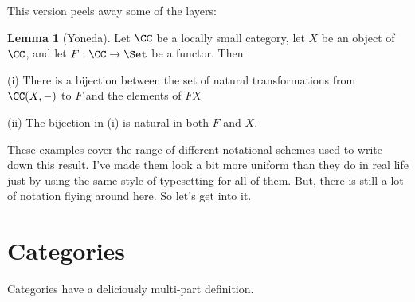 \documentclass[12pt]{article}
\theoremstyle{definition}
\newtheorem{lemma}[thm]{Lemma}
\theoremstyle{definition}
\theoremstyle{definition}
\numberwithin{equation}{section}
\begin{document}
\noindent
This version peels away some of the layers:

\begin{lemma}[Yoneda]\label{yoneda6}
Let $\CC$ be a locally small category, let $X$ be an object of $\CC$, and let $F: \CC \to \Set$ be a functor. Then

(i) There is a bijection between the set of natural transformations from $\CC(X, -)$ to $F$ and the elements of $FX$

(ii) The bijection in (i) is natural in both $F$ and $X$.
\end{lemma}

\noindent
These examples cover the range of different notational schemes used to write down this result. I've made them look a bit more uniform than they do in real life just by using the same style of typesetting for all of them. But, there is still a lot of notation flying around here. So let's get into it.

\section{Categories}

Categories have a deliciously multi-part definition.
\end{document}
